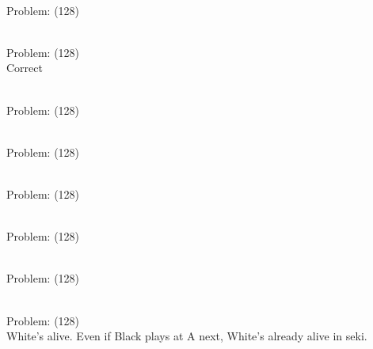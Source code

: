 \documentclass[11pt]{article}
\begin{document}
\begin{minipage}[t]{0.5\textwidth}
  {\centering
  
\\
Problem: (128)\\
  }
\end{minipage}
\begin{minipage}[t]{0.5\textwidth}
  {\centering
  
\\
Problem: (128)\\
Correct\\
  }
\end{minipage}
\begin{minipage}[t]{0.5\textwidth}
  {\centering
  
\\
Problem: (128)\\
  }
\end{minipage}
\begin{minipage}[t]{0.5\textwidth}
  {\centering
  
\\
Problem: (128)\\
  }
\end{minipage}
\begin{minipage}[t]{0.5\textwidth}
  {\centering
  
\\
Problem: (128)\\
  }
\end{minipage}
\begin{minipage}[t]{0.5\textwidth}
  {\centering
  
\\
Problem: (128)\\
  }
\end{minipage}
\begin{minipage}[t]{0.5\textwidth}
  {\centering
  
\\
Problem: (128)\\
  }
\end{minipage}
\begin{minipage}[t]{0.5\textwidth}
  {\centering
  
\\
Problem: (128)\\
White's alive. Even if Black plays at A next, White's already alive in seki.\\
  }
\end{minipage}
\end{document}

